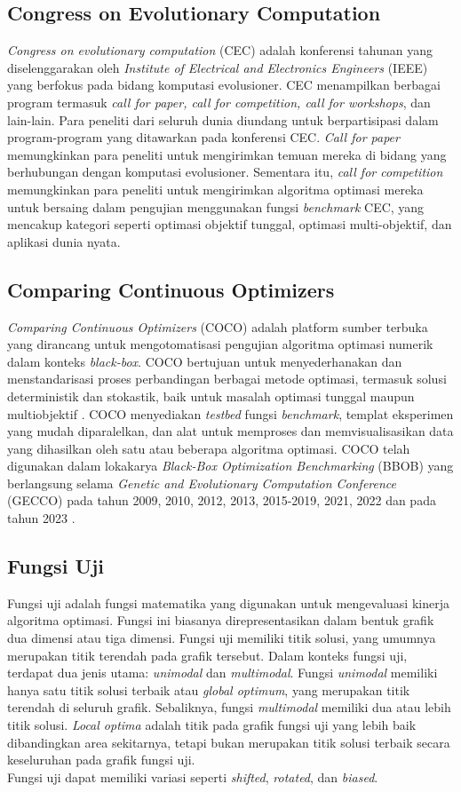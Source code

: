 \subsection{Congress on Evolutionary Computation}
\textit{Congress on evolutionary computation} (CEC) adalah konferensi tahunan yang diselenggarakan oleh \textit{Institute of Electrical and Electronics Engineers} (IEEE) yang berfokus pada bidang komputasi evolusioner. CEC menampilkan berbagai program termasuk \textit{call for paper, call for competition, call for workshops}, dan lain-lain. Para peneliti dari seluruh dunia diundang untuk berpartisipasi dalam program-program yang ditawarkan pada konferensi CEC. \textit{Call for paper} memungkinkan para peneliti untuk mengirimkan temuan mereka di bidang yang berhubungan dengan komputasi evolusioner. Sementara itu, \textit{call for competition} memungkinkan para peneliti untuk mengirimkan algoritma optimasi mereka untuk bersaing dalam pengujian menggunakan fungsi \textit{benchmark} CEC, yang mencakup kategori seperti optimasi objektif tunggal, optimasi multi-objektif, dan aplikasi dunia nyata.
\subsection{Comparing Continuous Optimizers}
\textit{Comparing Continuous Optimizers} (COCO) adalah platform sumber terbuka yang dirancang untuk mengotomatisasi pengujian algoritma optimasi numerik dalam konteks \textit{black-box}. COCO bertujuan untuk menyederhanakan dan menstandarisasi proses perbandingan berbagai metode optimasi, termasuk solusi deterministik dan stokastik, baik untuk masalah optimasi tunggal maupun multiobjektif \citep{hansen2021coco}. COCO menyediakan \textit{testbed} fungsi \textit{benchmark}, templat eksperimen yang mudah diparalelkan, dan alat untuk memproses dan memvisualisasikan data yang dihasilkan oleh satu atau beberapa algoritma optimasi. COCO telah digunakan dalam lokakarya \textit{Black-Box Optimization Benchmarking} (BBOB) yang berlangsung selama \textit{Genetic and Evolutionary Computation Conference} (GECCO) pada tahun 2009, 2010, 2012, 2013, 2015-2019, 2021, 2022 dan pada tahun 2023 \citep{numbboWhatCOCO}.
\subsection{Fungsi Uji}
Fungsi uji adalah fungsi matematika yang digunakan untuk mengevaluasi kinerja algoritma optimasi. Fungsi ini biasanya direpresentasikan dalam bentuk grafik dua dimensi atau tiga dimensi. Fungsi uji memiliki titik solusi, yang umumnya merupakan titik terendah pada grafik tersebut. Dalam konteks fungsi uji, terdapat dua jenis utama: \textit{unimodal} dan \textit{multimodal}. Fungsi \textit{unimodal} memiliki hanya satu titik solusi terbaik atau \textit{global optimum}, yang merupakan titik terendah di seluruh grafik. Sebaliknya, fungsi \textit{multimodal} memiliki dua atau lebih titik solusi. \textit{Local optima} adalah titik pada grafik fungsi uji yang lebih baik dibandingkan area sekitarnya, tetapi bukan merupakan titik solusi terbaik secara keseluruhan pada grafik fungsi uji.\\
Fungsi uji dapat memiliki variasi seperti \textit{shifted}, \textit{rotated}, dan \textit{biased}.
